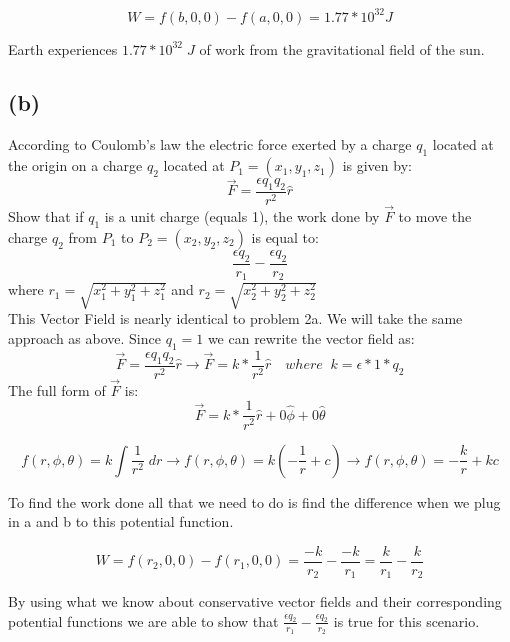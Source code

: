 \documentclass[11pt]{article}
\begin{document}
$$W= f(b,0,0) - f(a,0,0) = 1.77 * 10^{32} J$$

Earth experiences $1.77*10^{32}\;J$ of work from the gravitational field of the sun.


\subsection*{(b)}
According to Coulomb’s law the electric force exerted by a charge $q_1$ located at the origin on a charge $q_2$ located at $P_1 = (x_1, y_1, z_1)$ is given by:
\begin{equation}
    \vec{F} = \frac{\epsilon q_1 q_2}{r^2}\hat{r}
\end{equation}
Show that if $q_1$ is a unit charge (equals 1), the work done by $\vec{F}$ to move the charge $q_2$ from $P_1$ to $P_2 = (x_2, y_2, z_2)$ is equal to:
$$\frac{\epsilon q_2}{r_1} - \frac{\epsilon q_2}{r_2}$$
where $r_1 = \sqrt{x_1^2+y_1^2+z_1^2}$ and $r_2= \sqrt{x_2^2+y_2^2+z_2^2}$
\\

This Vector Field is nearly identical to problem 2a. We will take the same approach as above. Since $q_1=1$ we can rewrite the vector field as:
$$\vec{F} = \frac{\epsilon q_1 q_2}{r^2}\hat{r} \rightarrow \vec{F} = k*\frac{1}{r^2} \hat{r} \quad where\;\; k = \epsilon*1*q_2$$
The full form of $\vec{F}$ is:
$$\vec{F} = k*\frac{1}{r^2}\hat{r} + 0\hat{\phi}+0\hat{\theta}$$

$$f(r,\phi,\theta) = k \int \frac{1}{r^2} \; dr \rightarrow f(r,\phi,\theta) = k \left( -\frac{1}{r}+c \right) \rightarrow f(r,\phi,\theta) = -\frac{k}{r}+kc$$

To find the work done all that we need to do is find the difference when we plug in a and b to this potential function.

$$W= f(r_2,0,0) - f(r_1,0,0) = \frac{-k}{r_2} - \frac{-k}{r_1} = \frac{k}{r_1}-\frac{k}{r_2} $$

By using what we know about conservative vector fields and their corresponding potential functions we are able to show that $\frac{\epsilon q_2}{r_1} - \frac{\epsilon q_2}{r_2}$ is true for this scenario.
\end{document}
